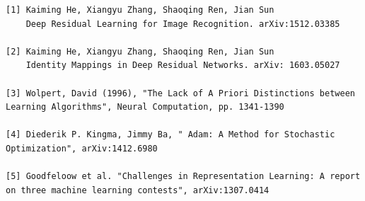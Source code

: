 \documentclass[12pt,twoside]{article}
\begin{document}
\begin{verbatim}
[1] Kaiming He, Xiangyu Zhang, Shaoqing Ren, Jian Sun
    Deep Residual Learning for Image Recognition. arXiv:1512.03385

[2] Kaiming He, Xiangyu Zhang, Shaoqing Ren, Jian Sun
    Identity Mappings in Deep Residual Networks. arXiv: 1603.05027
    
[3] Wolpert, David (1996), "The Lack of A Priori Distinctions between 
Learning Algorithms", Neural Computation, pp. 1341-1390

[4] Diederik P. Kingma, Jimmy Ba, " Adam: A Method for Stochastic 
Optimization", arXiv:1412.6980

[5] Goodfeloow et al. "Challenges in Representation Learning: A report 
on three machine learning contests", arXiv:1307.0414
\end{verbatim}
\end{document}
